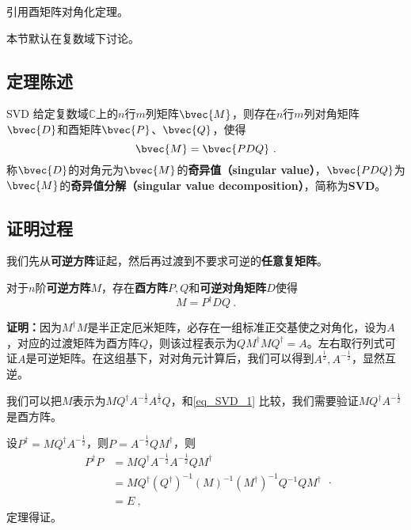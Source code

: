 
\begin{issues}
\issueTODO 引用酉矩阵对角化定理。
\end{issues}



本节默认在复数域下讨论。
\subsection{定理陈述}
\begin{theorem}{SVD}
给定复数域$\mathbb{C}$上的$n$行$m$列矩阵$\bvec{M}$，则存在$n$行$m$列对角矩阵$\bvec{D}$和酉矩阵$\bvec{P}$、$\bvec{Q}$，使得
\begin{equation}
\bvec{M} = \bvec{PDQ}~. 
\end{equation}
称$\bvec{D}$的对角元为$\bvec{M}$的\textbf{奇异值（singular value）}，$\bvec{PDQ}$为$\bvec{M}$的\textbf{奇异值分解（singular value decomposition）}，简称为\textbf{SVD}。
\end{theorem}


\subsection{证明过程}
我们先从\textbf{可逆方阵}证起，然后再过渡到不要求可逆的\textbf{任意复矩阵}。
\begin{theorem}{}\label{the_SVD_1}
对于$n$阶\textbf{可逆方阵}$M$，存在\textbf{酉方阵}$P,Q$和\textbf{可逆对角矩阵}$D$使得
\begin{equation}\label{eq_SVD_1}
M=P^{\dagger}DQ~.
\end{equation}

\end{theorem}
\textbf{证明：}因为$M^{\dagger}M$是半正定厄米矩阵，必存在一组标准正交基使之对角化，设为$A$，对应的过渡矩阵为酉方阵$Q$，则该过程表示为$QM^{\dagger}MQ^{\dagger}=A$。左右取行列式可证$A$是可逆矩阵。在这组基下，对对角元计算后，我们可以得到$A^{\frac{1}{2}},A^{-\frac{1}{2}}$，显然互逆。

我们可以把$M$表示为$MQ^{\dagger}A^{-\frac{1}{2}}A^{\frac{1}{2}}Q$，和\autoref{eq_SVD_1} 比较，我们需要验证$MQ^{\dagger}A^{-\frac{1}{2}}$是酉方阵。

设$P^{\dagger}=MQ^{\dagger}A^{-\frac{1}{2}}$，则$P=A^{-\frac{1}{2}}QM^{\dagger}$，则
\begin{equation}
\begin{aligned}
P^{\dagger}P&=MQ^{\dagger}A^{-\frac{1}{2}}A^{-\frac{1}{2}}QM^{\dagger}\\
&=MQ^{\dagger}(Q^{\dagger})^{-1}(M)^{-1}(M^{\dagger})^{-1}Q^{-1}QM^{\dagger}\\
&=E~,
\end{aligned}
~.
\end{equation}
定理得证。

